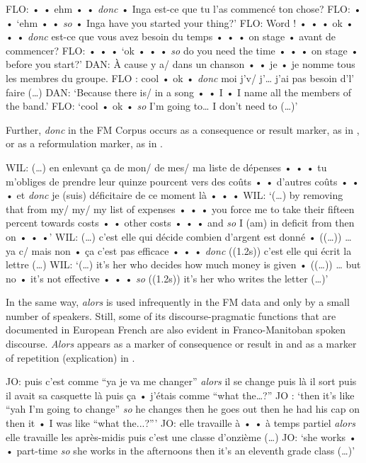 \documentclass[output=paper]{langscibook}
\begin{document}
\begin{exe}
    \ex\label{hennecke:ex:15} FLO: • • ehm • • \textit{donc} • Inga est-ce que tu l’as commencé ton chose?
    \glt FLO: • • ‘ehm • • \textit{so} • Inga have you started your thing?’
    \ex\label{hennecke:ex:16} FLO: Word ! • • • ok • • • \textit{donc} est-ce que vous avez besoin du temps • • • on stage • avant de commencer?
    \glt FLO: • • • ‘ok • • • \textit{so} do you need the time • • • on stage • before you start?’
    \ex\label{hennecke:ex:17} DAN: À cause y a/ dans un chanson • • je • je nomme tous les membres du groupe. FLO : cool • ok • \textit{donc} moi j’v/ j’… j’ai pas besoin d’l’ faire (…)
    \glt DAN: ‘Because there is/ in a song • • I • I name all the members of the band.’ FLO: ‘cool • ok • \textit{so} I’m going to… I don’t need to (…)’
\end{exe}

\noindent
Further, \textit{donc} in the FM Corpus occurs as a consequence or result marker, as in , or as a reformulation marker, as in .

\begin{exe}
    \ex\label{hennecke:ex:18} WIL: (…) en enlevant ça de mon/ de mes/ ma liste de dépenses • • • tu m’obliges de prendre leur quinze pourcent vers des coûts • • d’autres coûts • • • et \textit{donc} je (suis) déficitaire de ce moment là • • •
    \glt WIL: ‘(…) by removing that from  my/ my/ my list of expenses • • • you force me to take their fifteen percent towards costs • • other costs • • • and \textit{so} I (am) in deficit from then on • • •’
    \ex\label{hennecke:ex:19} WIL: (…) c’est elle qui décide combien d’argent est donné • ((…)) … ya c/ mais non • ça c’est pas efficace • • • \textit{donc} ((1.2s)) c’est elle qui écrit la lettre (…)
    \glt WIL: ‘(…) it’s her who decides how much money is given • ((…)) … but no • it’s not effective • • • \textit{so} ((1.2s)) it’s her who writes the letter (…)’
\end{exe}


In the same way, \textit{alors} is used infrequently in the FM data and only by a small number of speakers. Still, some of its discourse-pragmatic functions that are documented in European French are also evident in Franco-Manitoban spoken discourse. \textit{Alors} appears as a marker of consequence or result in  and as a marker of repetition (explication) in .

\begin{exe}
    \ex\label{hennecke:ex:20} JO: puis c’est comme “ya je va me changer” \textit{alors} il se change puis là il sort puis il avait sa casquette là puis ça • j’étais comme “what the…?”
    \glt JO : ‘then it’s like “yah I’m going to change” \textit{so} he changes then he goes out then he had his cap on then it • I was like “what the...?”’
    \ex\label{hennecke:ex:21} JO: elle travaille à • • à temps partiel \textit{alors} elle travaille les après-midis puis c’est une classe d’onzième (…)
    \glt JO: ‘she works • • part-time \textit{so} she works in the afternoons then it’s an eleventh grade class (…)’
\end{exe}
\end{document}

